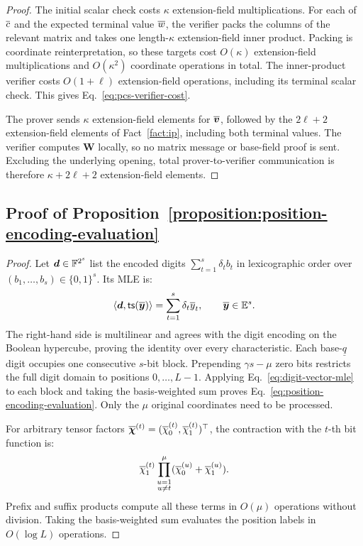 \begin{proof}
The initial scalar check costs \(\kappa\) extension-field
multiplications. For each of \(\overline{c}\) and the expected terminal
value \(\overline{w}\), the verifier packs the columns of the relevant
matrix and takes one length-\(\kappa\) extension-field inner
product. Packing is coordinate reinterpretation, so these targets
cost \(O(\kappa)\) extension-field multiplications and
\(O(\kappa^2)\) coordinate operations in total.
The inner-product verifier costs \(O(1+\ell)\) extension-field
operations, including its terminal scalar check.
This gives Eq.~\eqref{eq:pcs-verifier-cost}.

The prover sends \(\kappa\) extension-field elements for
\(\overline{\bm v}\), followed by the \(2\ell+2\) extension-field
elements of Fact~\ref{fact:ip}, including both terminal values.
The verifier computes \(\bm W\) locally, so no matrix message or
base-field proof is sent. Excluding the underlying opening, total
prover-to-verifier communication is therefore
\(\kappa+2\ell+2\) extension-field elements.
\end{proof}

\subsection{Proof of Proposition~\ref{proposition:position-encoding-evaluation}}
\label{appx:proof-position-encoding}

\begin{proof}
Let \(\bm d\in{\mathbb{F}}^{2^s}\) list the encoded digits
\(\sum_{t=1}^s\delta_tb_t\) in lexicographic order over
\((b_1,\ldots,b_s)\in\{0,1\}^s\).
Its MLE is:
\begin{equation}
    \left\langle\bm d,{\sf ts}(\overline{\bm y})\right\rangle
       =\sum_{t=1}^{s}\delta_t\overline{y}_t,
       \qquad \overline{\bm y}\in\mathbb{E}^s.
\label{eq:digit-vector-mle}
\end{equation}
The right-hand side is multilinear and agrees with the digit
encoding on the Boolean hypercube, proving the identity over
every characteristic.
Each base-\(\underline q\) digit occupies one consecutive
\(s\)-bit block. Prepending \(\gamma s-\mu\) zero bits restricts
the full digit domain to positions \(0,\ldots,L-1\).
Applying Eq.~\eqref{eq:digit-vector-mle} to each block and taking
the basis-weighted sum proves
Eq.~\eqref{eq:position-encoding-evaluation}.
Only the \(\mu\) original coordinates need to be processed.

For arbitrary tensor factors
\(\overline{\bm\chi}^{(t)}=(\overline{\chi}^{(t)}_0,\overline{\chi}^{(t)}_1)^\top\),
the contraction with the \(t\)-th bit function is:
\[
    \overline{\chi}^{(t)}_1
       \prod_{\substack{u=1\\u\ne t}}^\mu
          (\overline{\chi}^{(u)}_0+\overline{\chi}^{(u)}_1).
\]
Prefix and suffix products compute all these terms in
\(O(\mu)\) operations without division. Taking the basis-weighted
sum evaluates the position labels in \(O(\log L)\) operations.
\end{proof}

